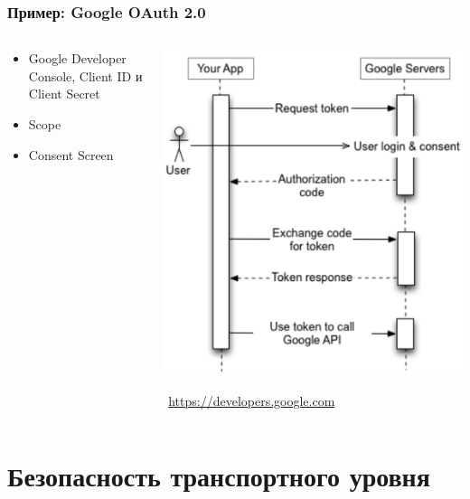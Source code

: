 \documentclass[xetex,mathserif,serif]{beamer}
\newcommand{\attribution}[1] {
\vspace{-5mm}\begin{flushright}\begin{scriptsize}\textcolor{gray}{\textcopyright\, #1}\end{scriptsize}\end{flushright}
}
\begin{document}
	\begin{frame}
		\frametitle{Пример: Google OAuth 2.0}
		\begin{columns}
			\begin{column}{0.5\textwidth}
				\begin{itemize}
					\item Google Developer Console, Client ID и Client Secret
					\item Scope
					\item Consent Screen
				\end{itemize}
			\end{column}
			\begin{column}{0.4\textwidth}
				\begin{center}
					\includegraphics[width=\textwidth]{googleOAuth.png}
					\attribution{\url{https://developers.google.com}}
				\end{center}
			\end{column}
		\end{columns}
	\end{frame}

	\section{Безопасность транспортного уровня}
\end{document}
